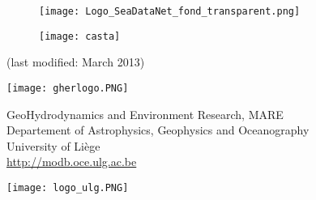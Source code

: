\begin{titlepage}


\begin{figure}[H]
\centering
\texttt{[image: Logo\_SeaDataNet\_fond\_transparent.png]}
\end{figure}

\begin{center}
\vspace*{1cm}

\colorbox{grey}{
	\parbox[t]{1.0\linewidth}{
	\huge
		\printtitle 
		\vspace*{0.7cm}
	}
}

  	\vspace*{1cm}
  	
\printauthor								%

\vspace*{1cm}


\begin{figure}[H]
\centering
\texttt{[image: casta]}
\end{figure}

\normalsize{(last modified: March 2013)}

\vfill

\parbox{.20\textwidth}{
\flushleft
\texttt{[image: gherlogo.PNG]}
}\parbox{.60\textwidth}{
\centering
\vspace{.4cm}


\footnotesize{GeoHydrodynamics and Environment Research, MARE\\ 
Departement of Astrophysics, Geophysics and Oceanography\\
University of Li\`{e}ge\\ 
\url{http://modb.oce.ulg.ac.be}
}
\vspace{.15cm}
}\parbox{.20\textwidth}{
\flushright
\texttt{[image: logo\_ulg.PNG]}
}

\end{center}

\end{titlepage}

%
%


